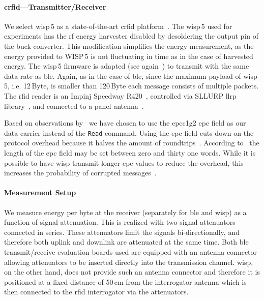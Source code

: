 \documentclass[conference,letterpaper,twoside,final,10pt]{IEEEtran}
\begin{document}
\paragraph{\acl{crfid}---Transmitter/Receiver}
\label{sec:motivation/wisp}

We select \ac{wisp}\,5 as a state-of-the-art \ac{crfid} platform~\cite{wiki2015wisp5}.
The \ac{wisp}\,5 used for experiments has the \ac{rf} energy harvester disabled by desoldering the output pin of the buck converter.
This modification simplifies the energy measurement, as the energy provided to WISP\,5 is not fluctuating in time as in the case of harvested energy.
The \ac{wisp}\,5 firmware is adapted (see again~\cite{blisp2015repo}) to transmit with the same data rate as \ac{ble}.
Again, as in the case of \ac{ble}, since the maximum payload of \ac{wisp}\,5, i.e. 12\,\si{Byte}, is smaller than 120\,\si{Byte} each message consists of multiple packets.
The \ac{rfid} reader is an Impinj Speedway R420~\cite{impinj2014r420}, controlled via SLLURP \ac{llrp} library~\cite{github2015sllurp}, and connected to a panel antenna~\cite{laird2015antenna}.

Based on observations by~\cite[Sec. 4.1]{gummeson2012flit} we have chosen to use the \ac{epcc1g2} \ac{epc} field as our data carrier instead of the \texttt{Read} command.
Using the \ac{epc} field cuts down on the protocol overhead because it halves the amount of roundtrips~\cite[Sec. 6.3.2.12.3]{epcglobal2013gen2}.
According to~\cite[Sec. 6.3.2.1.2.2]{epcglobal2013gen2} the length of the \ac{epc} field may be set between zero and thirty one words.
While it is possible to have \ac{wisp} transmit longer \ac{epc} values to reduce the overhead, this increases the probability of corrupted messages~\cite{lettieri1998info}. 

\paragraph{Measurement Setup}
\label{sec:motivation/method}

We measure energy per byte at the receiver (separately for \ac{ble} and \ac{wisp}) as a function of signal attenuation.
This is realized with two signal attenuators~\cite{jfw2015attenuators} connected in series.
These attenuators limit the signals bi-directionally, and therefore both uplink and downlink are attenuated at the same time.
Both \ac{ble} transmit/receive evaluation boards used are equipped with an antenna connector allowing attenuators to be inserted directly into the transmission channel.
\ac{wisp}, on the other hand, does not provide such an antenna connector and therefore it is positioned at a fixed distance of 50\,\si{\centi\metre} from the interrogator antenna which is then connected to the \ac{rfid} interrogator via the attenuators.
\end{document}
